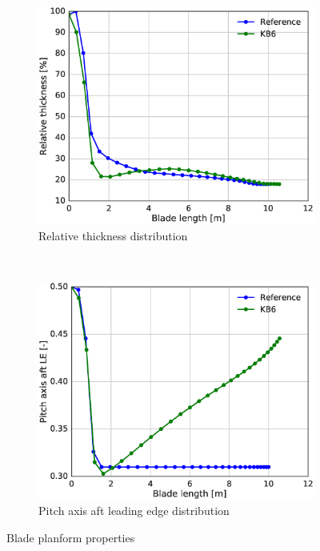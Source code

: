 \begin{figure}[tph]
\begin{subfigure}{0.50\textwidth}
\includegraphics[width=\linewidth]{figures/KB6_final/KB6_rthick.eps}
\caption{Relative thickness distribution}
\label{subfig:KB6_rthick}
\end{subfigure}
 ~
\begin{subfigure}{0.50\textwidth}
\includegraphics[width=\linewidth]{figures/KB6_final/KB6_ple.eps}
\caption{Pitch axis aft leading edge distribution}
\label{subfig:KB6_ple}
\end{subfigure}

\caption{Blade planform properties}
\label{fig:KB6_blade_geom}
\end{figure}

